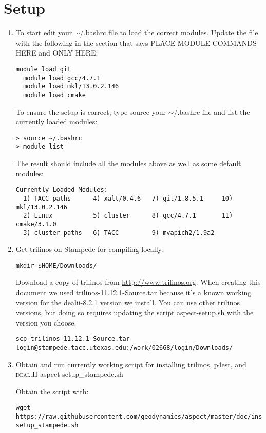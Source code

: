 \documentclass{article}
\newcommand{\dealii}{{\textsc{deal.II}}}
\begin{document}
\section{Setup}
\begin{enumerate}
\item To start edit your $\sim$/.bashrc file to load the correct modules. Update the file with the following in the 
section that says PLACE MODULE COMMANDS HERE and ONLY HERE: 

\begin{lstlisting}[frame=single,language=ksh]
  module load git 
  module load gcc/4.7.1 
  module load mkl/13.0.2.146 
  module load cmake 
\end{lstlisting}

To ensure the setup is correct, type source your $\sim$/.bashrc file and list the currently loaded modules:
\begin{lstlisting}[frame=single,language=ksh]
> source ~/.bashrc 
> module list
\end{lstlisting}
The result should include all the modules above as well as some default modules:
\begin{lstlisting}[frame=single,language=ksh]
Currently Loaded Modules:
  1) TACC-paths      4) xalt/0.4.6   7) git/1.8.5.1     10) mkl/13.0.2.146
  2) Linux           5) cluster      8) gcc/4.7.1       11) cmake/3.1.0
  3) cluster-paths   6) TACC         9) mvapich2/1.9a2
\end{lstlisting}

\item Get trilinos on Stampede for compiling locally. 

\begin{lstlisting}[frame=single,language=ksh]
mkdir $HOME/Downloads/ 
\end{lstlisting} 
Download a copy of trilinos from \url{http://www.trilinos.org}. When creating this document we used 
 trilinos-11.12.1-Source.tar because it's a known working version for the dealii-8.2.1 
 version we install. You can use other trilinos versions, but doing so requires updating 
 the script aspect-setup.sh with the version you choose.
\begin{lstlisting}[frame=single,language=ksh]
 scp trilinos-11.12.1-Source.tar  login@stampede.tacc.utexas.edu:/work/02668/login/Downloads/ 
\end{lstlisting} 
 
 \item Obtain and run currently working script for installing trilinos, p4est, and \dealii{}  aspect-setup\_stampede.sh 
 
 
Obtain the script with: 
\begin{lstlisting}[frame=single,language=ksh]
wget https://raw.githubusercontent.com/geodynamics/aspect/master/doc/install/aspect-setup_stampede.sh
\end{lstlisting}  
 
 \end{enumerate}
\end{document}
